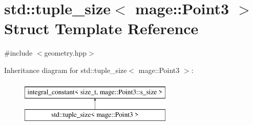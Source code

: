 \hypertarget{structstd_1_1tuple__size_3_01mage_1_1_point3_01_4}{}\section{std\+:\+:tuple\+\_\+size$<$ mage\+:\+:Point3 $>$ Struct Template Reference}
\label{structstd_1_1tuple__size_3_01mage_1_1_point3_01_4}


{\ttfamily \#include $<$geometry.\+hpp$>$}

Inheritance diagram for std\+:\+:tuple\+\_\+size$<$ mage\+:\+:Point3 $>$\+:\begin{figure}[H]
\begin{center}
\leavevmode
\includegraphics[height=2.000000cm]{structstd_1_1tuple__size_3_01mage_1_1_point3_01_4}
\end{center}
\end{figure}
